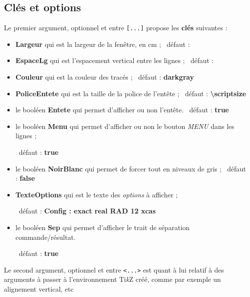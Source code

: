 \documentclass[french,a4paper,11pt]{article}
\providecommand\tikzlogo{Ti\textit{k}Z}
\let\TikZ\tikzlogo
\newcommand\Cle[1]{{\bfseries\sffamily\textlangle #1\textrangle}}
\begin{document}
\subsection{Clés et options}

\begin{tipblock}
Le premier argument, optionnel et entre \texttt{[...]} propose les \Cle{clés} suivantes :

\begin{itemize}
	\item \Cle{Largeur} qui est la largeur de la fenêtre, en cm ; \hfill~défaut : \Cle{10}
	\item \Cle{EspaceLg} qui est l'espacement vertical entre les lignes ; \hfill~défaut : \Cle{2pt}
	\item \Cle{Couleur} qui est la couleur des tracés ; \hfill~défaut : \Cle{darkgray}
	\item \Cle{PoliceEntete} qui est la taille de la police de l'entête ; \hfill~défaut : \Cle{\textbackslash scriptsize}
	\item le booléen \Cle{Entete} qui permet d'afficher ou non l'entête. \hfill~défaut : \Cle{true}
	\item le booléen \Cle{Menu} qui permet d'afficher ou non le bouton \textit{MENU} dans les lignes ;
	
	\hfill~défaut : \Cle{true}
	\item le booléen \Cle{NoirBlanc} qui permet de forcer tout en niveaux de gris ; \hfill~défaut : \Cle{false}
	\item \Cle{TexteOptions} qui est le texte des \textit{options} à afficher ;
	
	\hfill~défaut : \Cle{Config : exact real RAD 12 xcas}
	\item le booléen \Cle{Sep} qui permet d'afficher le trait de séparation commande/résultat.
	
	\hfill~défaut : \Cle{true}
\end{itemize}
\vspace*{-\baselineskip}\leavevmode
\end{tipblock}

\begin{tipblock}
Le second argument, optionnel et entre \texttt{<...>} est quant à lui relatif à des arguments à passer à l'environnement \TikZ{} créé, comme par exemple un alignement vertical, etc
\end{tipblock}

\begin{PresentationCode}{}
\begin{CalculFormelXcas}[PoliceEntete=\large,Largeur=13,NoirBlanc]
\end{CalculFormelXcas}
\end{PresentationCode}
\end{document}
